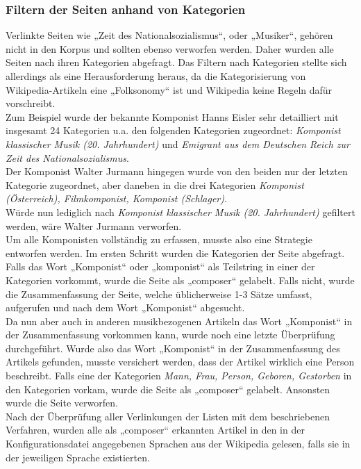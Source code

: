 \documentclass[ngerman]{ttlab-qualify}
\begin{document}
\subsubsection{Filtern der Seiten anhand von Kategorien}
Verlinkte Seiten wie „Zeit des Nationalsozialismus“, oder „Musiker“, gehören nicht in den Korpus und sollten ebenso verworfen werden. Daher wurden alle Seiten nach ihren Kategorien abgefragt. Das Filtern nach Kategorien stellte sich allerdings als eine Herausforderung heraus, da die Kategorisierung von Wikipedia-Artikeln eine „Folksonomy“ ist und Wikipedia keine Regeln dafür vorschreibt.\\ 
Zum Beispiel wurde der bekannte Komponist Hanns Eisler sehr detailliert mit insgesamt 24 Kategorien u.a. den folgenden Kategorien zugeordnet: \textit{Komponist klassischer Musik (20. Jahrhundert)} und \textit{Emigrant aus dem Deutschen Reich zur Zeit des Nationalsozialismus}.\\
Der Komponist Walter Jurmann hingegen wurde von den beiden nur der letzten Kategorie zugeordnet, aber daneben in die drei Kategorien \textit{Komponist (Österreich), Filmkomponist, Komponist (Schlager)}.\\ 
Würde nun lediglich nach \textit{Komponist klassischer Musik (20. Jahrhundert)} gefiltert werden, wäre Walter Jurmann verworfen.\\
Um alle Komponisten vollständig zu erfassen, musste also eine Strategie entworfen werden. Im ersten Schritt wurden die Kategorien der Seite abgefragt. Falls das Wort „Komponist“ oder „komponist“ als Teilstring in einer der Kategorien vorkommt, wurde die Seite als „composer“ gelabelt. Falls nicht, wurde die Zusammenfassung der Seite, welche üblicherweise 1-3 Sätze umfasst, aufgerufen und nach dem Wort „Komponist“ abgesucht. \\
Da nun aber auch in anderen musikbezogenen Artikeln das Wort „Komponist“ in der Zusammenfassung vorkommen kann, wurde noch eine letzte Überprüfung durchgeführt. Wurde also das Wort „Komponist“ in der Zusammenfassung des Artikels gefunden, musste versichert werden, dass der Artikel wirklich eine Person beschreibt. Falls eine der Kategorien \textit{Mann, Frau, Person, Geboren, Gestorben} in den Kategorien vorkam, wurde die Seite als „composer“ gelabelt. Ansonsten wurde die Seite verworfen.\\
Nach der Überprüfung aller Verlinkungen der Listen mit dem beschriebenen Verfahren, wurden alle als „composer“ erkannten Artikel in den in der Konfigurationsdatei angegebenen Sprachen aus der Wikipedia gelesen, falls sie in der jeweiligen Sprache existierten. 
\end{document}
